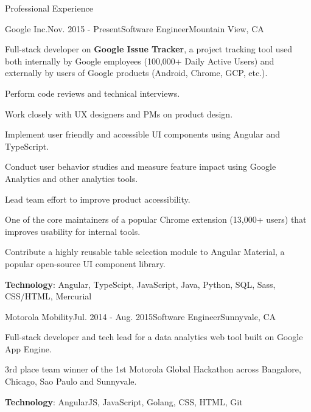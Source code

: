 \documentclass{resume} %
\begin{document}
\begin{rSection}{Professional Experience}

\begin{rSubsection}{Google Inc.}{Nov. 2015 - Present}{Software Engineer}{Mountain View, CA}
\item Full-stack developer on \textbf{Google Issue Tracker}, a project tracking tool used both internally by Google employees (100,000+ Daily Active Users) and externally by users of Google products (Android, Chrome, GCP, etc.).
\item Perform code reviews and technical interviews.
\item Work closely with UX designers and PMs on product design.
\item Implement user friendly and accessible UI components using Angular and TypeScript. 
\item Conduct user behavior studies and measure feature impact using Google Analytics and other analytics tools.
\item Lead team effort to improve product accessibility.
\item One of the core maintainers of a popular Chrome extension (13,000+ users) that improves usability for internal tools.
\item Contribute a highly reusable table selection module to Angular Material, a popular open-source UI component library.
\item \textbf{Technology}: Angular, TypeScipt, JavaScript, Java, Python, SQL, Sass, CSS/HTML, Mercurial

\end{rSubsection}

\begin{rSubsection}{Motorola Mobility}{Jul. 2014 - Aug. 2015}{Software Engineer}{Sunnyvale, CA}
\item Full-stack developer and tech lead for a data analytics web tool built on Google App Engine.
\item 3rd place team winner of the 1st Motorola Global Hackathon across Bangalore, Chicago, Sao Paulo and Sunnyvale.
\item \textbf{Technology}: AngularJS, JavaScript, Golang, CSS, HTML, Git
\end{rSubsection}


\end{rSection}
\end{document}
